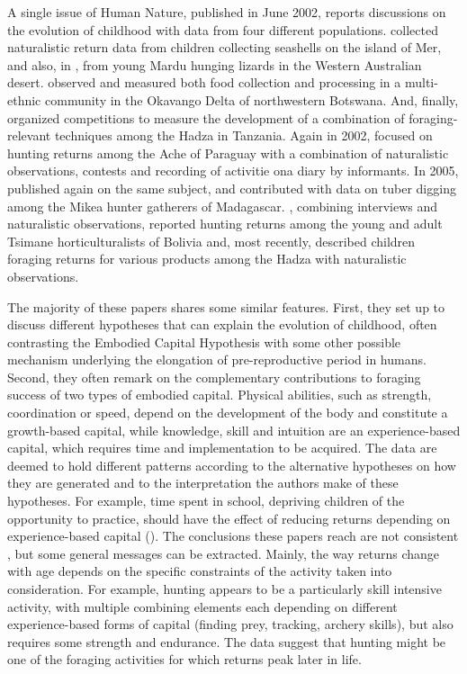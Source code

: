 A single issue of Human Nature, published in June 2002, reports discussions on the evolution of childhood with data from four different populations. \cite{bird_children_2002} collected naturalistic return data from children collecting seashells on the island of Mer, and also, in \cite{bird_constraints_2002}, from young Mardu hunging lizards in the Western Australian desert. \cite{bock_learning_2002} observed and measured both food collection and processing in a multi-ethnic community in the Okavango Delta of northwestern Botswana. And, finally,\cite{blurton_jones_selection_2002} organized competitions to measure the development of a combination of foraging-relevant techniques among the Hadza in Tanzania. 
Again in 2002, \cite{walker_age-dependency_2002} focused on hunting returns among the Ache of Paraguay with a combination of naturalistic observations, contests and recording of activitie ona diary by informants. 
In 2005, \cite{bock_what_2005} published again on the same subject, and \cite{tucker_growing_2005} contributed with data on tuber digging among the Mikea hunter gatherers of Madagascar. 
\cite{gurven_how_2006}, combining interviews and naturalistic observations, reported hunting returns among the young and adult Tsimane horticulturalists of Bolivia and, most recently, \cite{crittenden_juvenile_2013} described children foraging returns for various products among the Hadza with naturalistic observations.

The majority of these papers shares some similar features. 
First, they set up to discuss different hypotheses that can explain the evolution of childhood, often contrasting the Embodied Capital Hypothesis with some other possible mechanism underlying the elongation of pre-reproductive period in humans. 
Second, they often remark on the complementary contributions to foraging success of two types of embodied capital. Physical abilities, such as strength, coordination or speed, depend on the development of the body and constitute a growth-based capital, while knowledge, skill and intuition are an experience-based capital, which requires time and implementation to be acquired. 
The data are deemed to hold different patterns according to the alternative hypotheses on how they are generated and to the interpretation the authors make of these hypotheses. For example, time spent in school, depriving children of the opportunity to practice, should have the effect of reducing returns depending on experience-based capital (\cite{blurton_jones_selection_2002}).
The conclusions these papers reach are not consistent
, but some general messages can be extracted. 
Mainly, the way returns change with age depends on the specific constraints of the activity taken into consideration. For example, hunting appears to be a particularly skill intensive activity, with multiple combining elements each depending on different experience-based forms of capital (finding prey, tracking, archery skills), but also requires some strength and endurance. The data suggest that hunting might be one of the foraging activities for which returns peak later in life. 

